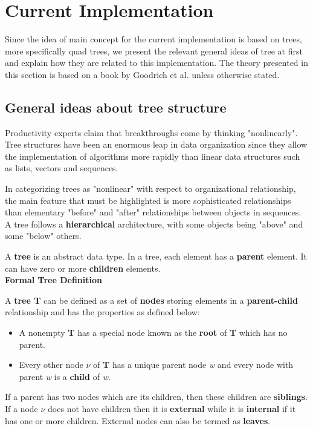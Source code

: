 \chapter{Current Implementation}
\label{chapter:myImplementation}

Since the idea of main concept for the current implementation is based on trees, more specifically quad trees, we present the relevant general ideas of tree at first and explain how they are related to this implementation. The theory presented in this section is based on a book by Goodrich et al. unless otherwise stated\cite{goodrich2007data}.

 \section{General ideas about tree structure}
 
 		
		Productivity experts claim that breakthroughs come by thinking "nonlinearly". Tree structures have been an enormous leap in data organization since they allow the implementation of algorithms more rapidly than linear data structures such as lists, vectors and sequences. 
		
		In categorizing trees as "nonlinear" with respect to organizational relationship, the main feature that must be highlighted is more sophisticated relationships than elementary "before" and "after" relationships between objects in sequences. A tree follows a \textbf{hierarchical} architecture, with some objects being "above" and some "below" others. 
		
		A \textbf{tree} is an abstract data type. In a tree, each element has a \textbf{parent} element. It can have zero or more \textbf{children} elements.
		\\
		\textbf{Formal Tree Definition}
		
		A \textbf{tree T} can be defined as a set of \textbf{nodes} storing elements in a \textbf{parent-child} relationship and has the properties as defined below:
		\begin{itemize}
			\item A nonempty \textbf{T} has a special node known as the \textbf{root} of \textbf{T} which has no parent. 
			\item Every other node \textit{$\nu$} of \textbf{T} has a unique parent node \textit{w} and every node with parent \textit{w} is a \textbf{child} of \textit{w}.
		\end{itemize}

		If a parent has two nodes which are its children, then these children are \textbf{siblings}. If a node \textit{$\nu$} does not have children then it is \textbf{external} while it is \textbf{internal} if it has one or more children. External nodes can also be termed as \textbf{leaves}.
		
